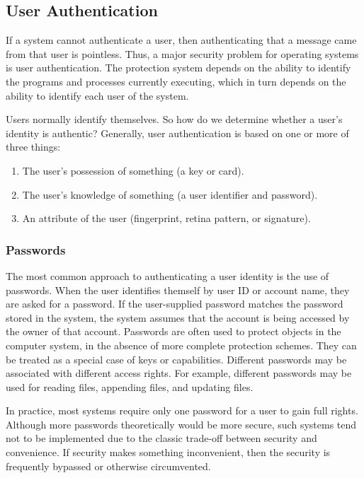 \subsection{User Authentication}\label{subsec:User_Authentication}
If a system cannot authenticate a user, then authenticating that a message came from that user is pointless.
Thus, a major security problem for operating systems is user authentication.
The protection system depends on the ability to identify the programs and processes currently executing, which in turn depends on the ability to identify each user of the system.

Users normally identify themselves.
So how do we determine whether a user’s identity is authentic?
Generally, user authentication is based on one or more of three things:
\begin{enumerate}[noitemsep]
\item The user’s possession of something (a key or card).
\item The user’s knowledge of something (a user identifier and password).
\item An attribute of the user (fingerprint, retina pattern, or signature).
\end{enumerate}

\subsubsection{Passwords}\label{subsubsec:User_Authentication_Passwords}
The most common approach to authenticating a user identity is the use of passwords.
When the user identifies themself by user ID or account name, they are asked for a password.
If the user-supplied password matches the password stored in the system, the system assumes that the account is being accessed by the owner of that account.
Passwords are often used to protect objects in the computer system, in the absence of more complete protection schemes.
They can be treated as a special case of keys or capabilities.
Different passwords may be associated with different access rights.
For example, different passwords may be used for reading files, appending files, and updating files.

In practice, most systems require only one password for a user to gain full rights.
Although more passwords theoretically would be more secure, such systems tend not to be implemented due to the classic trade-off between security and convenience.
If security makes something inconvenient, then the security is frequently bypassed or otherwise circumvented.

